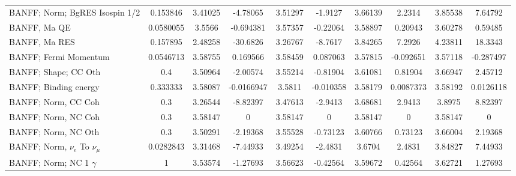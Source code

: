 {\begin{landscape}
\begin{table}
{\begin{tabular}{| l | S | S  S | S  S | S  S | S  S | }
      BANFF; Norm; BgRES Isospin 1/2 &        0.153846 &         3.41025 &        -4.78065 &         3.51297 &         -1.9127 &         3.66139 &          2.2314 &         3.85538 &         7.64792 \\ 
      BANFF, Ma QE                   &       0.0580055 &          3.5566 &       -0.694381 &         3.57357 &        -0.22064 &         3.58897 &         0.20943 &         3.60278 &         0.59485 \\ 
      BANFF, Ma RES                  &        0.157895 &         2.48258 &        -30.6826 &         3.26767 &         -8.7617 &         3.84265 &          7.2926 &         4.23811 &         18.3343 \\ 
      BANFF; Fermi Momentum          &       0.0546713 &         3.58755 &        0.169566 &         3.58459 &        0.087063 &         3.57815 &       -0.092651 &         3.57118 &       -0.287497 \\ 
      BANFF; Shape; CC Oth           &             0.4 &         3.50964 &        -2.00574 &         3.55214 &        -0.81904 &         3.61081 &         0.81904 &         3.66947 &         2.45712 \\ 
      BANFF; Binding energy          &        0.333333 &         3.58087 &      -0.0166947 &          3.5811 &       -0.010358 &         3.58179 &       0.0087373 &         3.58192 &       0.0126118 \\ 
      BANFF; Norm, CC Coh            &             0.3 &         3.26544 &        -8.82397 &         3.47613 &         -2.9413 &         3.68681 &          2.9413 &          3.8975 &         8.82397 \\ 
      BANFF; Norm, NC Coh            &             0.3 &         3.58147 &               0 &         3.58147 &               0 &         3.58147 &               0 &         3.58147 &               0 \\ 
      BANFF; Norm, NC Oth            &             0.3 &         3.50291 &        -2.19368 &         3.55528 &        -0.73123 &         3.60766 &         0.73123 &         3.66004 &         2.19368 \\ 
      BANFF; Norm, $\nu_{e}$ To $\nu_{\mu}$             &       0.0282843 &         3.31468 &        -7.44933 &         3.49254 &         -2.4831 &          3.6704 &          2.4831 &         3.84827 &         7.44933 \\ 
      BANFF; Norm; NC 1 $\gamma$                        &               1 &         3.53574 &        -1.27693 &         3.56623 &        -0.42564 &         3.59672 &         0.42564 &         3.62721 &         1.27693 \\ 

\end{tabular}}
\end{table}
\end{landscape}}
